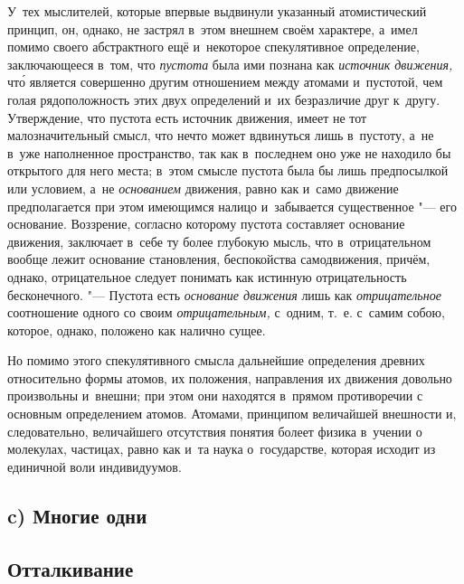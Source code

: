 У~тех мыслителей, которые впервые выдвинули указанный атомистический
принцип, он, однако, не застрял в~этом внешнем своём характере, а~имел
помимо своего абстрактного ещё и~некоторое спекулятивное определение,
заключающееся в~том, что {\em пустота} была ими познана
как {\em источник движения,} чт\'{о} является совершенно
другим отношением между атомами и~пустотой, чем голая рядоположность этих
двух определений и~их безразличие друг к~другу. Утверждение, что пустота
есть источник движения, имеет не тот малозначительный смысл, что нечто
может вдвинуться лишь в~пустоту, а~не в~уже наполненное пространство, так
как в~последнем оно уже не находило бы открытого для него места; в~этом
смысле пустота была бы лишь предпосылкой или условием, а~не
{\em основанием} движения, равно как и~само движение
предполагается при этом имеющимся налицо и~забывается существенное "--- его
основание. Воззрение, согласно которому пустота составляет основание
движения, заключает в~себе ту более глубокую мысль, что в~отрицательном
вообще лежит основание становления, беспокойства самодвижения, причём,
однако, отрицательное следует понимать как истинную отрицательность
бесконечного. "--- Пустота есть {\em основание движения}
лишь как {\em отрицательное} соотношение одного со
своим {\em отрицательным,} с~одним, т.~е. с~самим
собою, которое, однако, положено как налично сущее.

Но помимо этого спекулятивного смысла дальнейшие определения древних
относительно формы атомов, их положения, направления их движения довольно
произвольны и~внешни; при этом они находятся в~прямом противоречии с
основным определением атомов. Атомами, принципом величайшей внешности и,
следовательно, величайшего отсутствия понятия болеет физика в~учении о
молекулах, частицах, равно как и~та наука о~государстве, которая исходит из
единичной воли индивидуумов.

\subsection[c) Многие одни. Отталкивание]%
{c) Многие одни\\\vspace{2mm}\\{\mdseries\lsstyle Отталкивание}}

